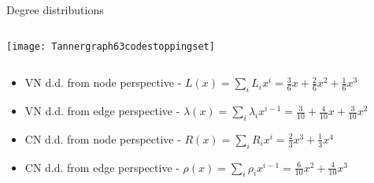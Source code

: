 \begin{frame}{Degree distributions}
\begin{columns}
\begin{column}{0.43\textwidth}
\begin{center}
\texttt{[image: Tannergraph63codestoppingset]}
\end{center}
\end{column}
\begin{column}{0.57\textwidth}
\end{column}
\end{columns}

\begin{itemize}
\item VN d.d. from node perspective - $L(x) = \sum_i L_i x^i = \frac{3}{6} x + \frac26 x^2 + \frac16 x^3$
\vspace{1mm}
\pause
\item VN d.d. from edge perspective - $\lambda(x) = \sum_i \lambda_i x^{i-1} = \frac{3}{10} + \frac{4}{10} x + \frac {3}{10} x^2$
\vspace{1mm}
\pause
\item CN d.d. from node perspective - $R(x) = \sum_i R_i x^i = \frac{2}{3}x^3 + \frac13 x^4 $
\vspace{1mm}
\pause
\item CN d.d. from edge perspective - $\rho(x) =\sum_i \rho_i x^{i-1} = \frac{6}{10} x^2+ \frac{4}{10} x^3$
\end{itemize}

\end{frame}
